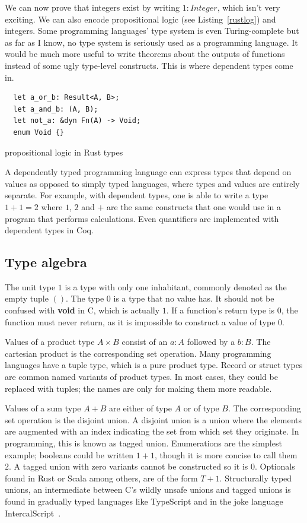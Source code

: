 \documentclass[english, 12pt, a4paper, sci, a-1b, online]{aaltothesis}
\begin{document}
We can now prove that integers exist by writing $1: Integer$, which isn't very exciting. We can also encode propositional logic (see Listing~\ref{rustlog}) and integers. Some programming languages' type system is even Turing-complete but as far as I know, no type system is seriously used as a programming language. It would be much more useful to write theorems about the outputs of functions instead of some ugly type-level constructs. This is where dependent types come in.

\begin{listing}[h]
  \begin{verbatim}
  let a_or_b: Result<A, B>;
  let a_and_b: (A, B);
  let not_a: &dyn Fn(A) -> Void;
  enum Void {}
  \end{verbatim}
  \caption{propositional logic in Rust types}
  \label{rustlog}
\end{listing}

A dependently typed programming language can express types that depend on values as opposed to simply typed languages, where types and values are entirely separate. For example, with dependent types, one is able to write a type $1 + 1 = 2$ where $1$, $2$ and $+$ are the same constructs that one would use in a program that performs calculations. Even quantifiers are implemented with dependent types in Coq.

\subsection{Type algebra}

The unit type $1$ is a type with only one inhabitant, commonly denoted as the empty tuple $()$. The type $0$ is a type that no value has. It should not be confused with \textbf{void} in C, which is actually $1$. If a function's return type is $0$, the function must never return, as it is impossible to construct a value of type $0$.

Values of a product type $A \times B$ consist of an $a : A$ followed by a $b : B$. The cartesian product is the corresponding set operation. Many programming languages have a tuple type, which is a pure product type. Record or struct types are common named variants of product types. In most cases, they could be replaced with tuples; the names are only for making them more readable.

Values of a sum type $A + B$ are either of type $A$ or of type $B$. The corresponding set operation is the disjoint union. A disjoint union is a union where the elements are augmented with an index indicating the set from which set they originate. In programming, this is known as tagged union. Enumerations are the simplest example; booleans could be written $1 + 1$, though it is more concise to call them $2$. A tagged union with zero variants cannot be constructed so it is $0$. Optionals found in Rust or Scala among others, are of the form $T + 1$. Structurally typed unions, an intermediate between C's wildly unsafe unions and tagged unions is found in gradually typed languages like TypeScript and in the joke language IntercalScript~\cite{ICS}.
\end{document}
